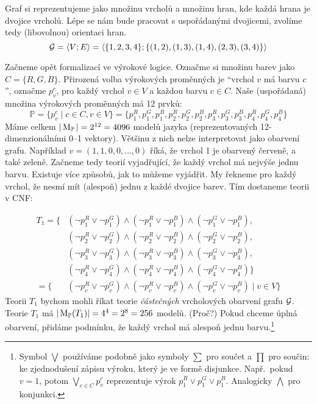 Graf si reprezentujeme jako množinu vrcholů a množinu hran, kde každá hrana je dvojice vrcholů. Lépe se nám bude pracovat s uspořádanými dvojicemi, zvolíme tedy (libovolnou) orientaci hran.
\[
\mathcal{G} = \langle V; E \rangle = \langle \{1,2,3,4\}; \{(1,2),(1,3),(1,4),(2,3),(3,4)\} \rangle
\]



Začneme opět formalizací ve výrokové logice. Označme si množinu barev jako \( C=\{R,G,B\} \).  Přirozená volba výrokových proměnných je ``vrchol \(v\) má barvu \(c\)'', označme \(p_v^c\), pro každý vrchol \(v \in V\) a každou barvu \(c\in C\). Naše (uspořádaná) množina výrokových proměnných má 12 prvků:
\[
\mathbb P=\{p_v^c\mid c\in C,v\in V\}=\{p_1^R,p_1^G,p_1^B,p_2^R,p_2^G,p_2^B,p_3^R,p_3^G,p_3^B,p_4^R,p_4^G,p_4^B\}
\]
Máme celkem \( |\operatorname{M}_\mathbb P|=2^{12}=4096 \) modelů jazyka (reprezentovaných 12-dimenzionálními 0--1 vektory). Většinu z nich nelze interpretovat jako obarvení grafu. Například \( v=(1,1,0,0,\dots,0) \) říká, že vrchol 1 je obarvený červeně, a také zeleně. Začneme tedy teorií vyjadřující, že každý vrchol má nejvýše jednu barvu. Existuje více způsobů, jak to můžeme vyjádřit. My řekneme pro každý vrchol, že nesmí mít (alespoň) jednu z každé dvojice barev. Tím dostaneme teorii v {CNF}:

\begin{align*}
T_1 = \{ 
&(\neg p_1^R \lor \neg p_1^G) \land (\neg p_1^R \lor \neg p_1^B) \land (\neg p_1^G \lor \neg p_1^B),\\
&(\neg p_2^R \lor \neg p_2^G) \land (\neg p_2^R \lor \neg p_2^B) \land (\neg p_2^G \lor \neg p_2^B),\\
&(\neg p_3^R \lor \neg p_3^G) \land (\neg p_3^R \lor \neg p_3^B) \land (\neg p_3^G \lor \neg p_3^B),\\
&(\neg p_4^R \lor \neg p_4^G) \land (\neg p_4^R \lor \neg p_4^B) \land (\neg p_4^G \lor \neg p_4^B)\} \\
    = \{ &(\neg p_v^R \lor \neg p_v^G) \land (\neg p_v^R \lor \neg p_v^B) \land (\neg p_v^G \lor \neg p_v^B) \mid v \in V \} 
\end{align*}
Teorii \(T_1\) bychom mohli říkat teorie \emph{částečných} vrcholových obarvení grafu \(\mathcal{G}\). Teorie \(T_1\) má \(|\operatorname{M}_\mathbb P(T_1)|= 4^4=2^8=256\) modelů. (Proč?) Pokud chceme úplná obarvení, přidáme podmínku, že každý vrchol má alespoň jednu barvu.\footnote{Symbol \(\bigvee \) používáme podobně jako symboly \(\sum \) pro součet a \(\prod \) pro součin: ke zjednodušení zápisu výroku, který je ve formě disjunkce. Např.\ pokud \(v=1\), potom \( \bigvee_{c\in C} p_v^c \) reprezentuje výrok \( p_1^R \lor p_1^G \lor p_1^B \). Analogicky \(\bigwedge \) pro konjunkci.}

